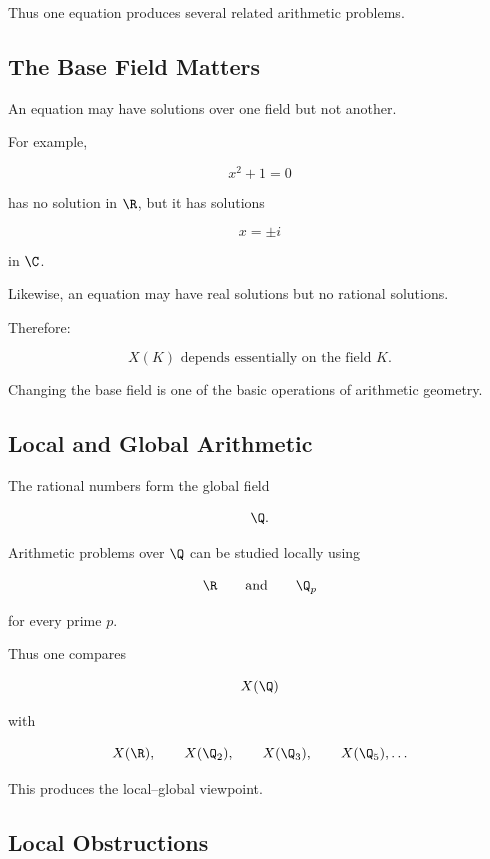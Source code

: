Thus one equation produces several related arithmetic problems.

\subsection{The Base Field Matters}
\label{subsec:base-field-matters}

An equation may have solutions over one field but not another.

For example,

\[ x^2+1=0 \]

has no solution in \(\R\), but it has solutions

\[ x=\pm i \]

in \(\C\).

Likewise, an equation may have real solutions but no rational solutions.

Therefore:

\[
\boxed{
X(K)\text{ depends essentially on the field }K.
}
\]

Changing the base field is one of the basic operations of arithmetic
geometry.

\subsection{Local and Global Arithmetic}
\label{subsec:local-global-arithmetic-geometry}

The rational numbers form the global field

\[ \Q. \]

Arithmetic problems over \(\Q\) can be studied locally using

\[
\R
\qquad\text{and}\qquad
\Q_p
\]

for every prime \(p\).

Thus one compares

\[ X(\Q) \]

with

\[ X(\R),\qquad X(\Q_2),\qquad X(\Q_3),\qquad X(\Q_5),\ldots \]

This produces the local--global viewpoint.

\subsection{Local Obstructions}
\label{subsec:local-obstructions-arithmetic-geometry}

